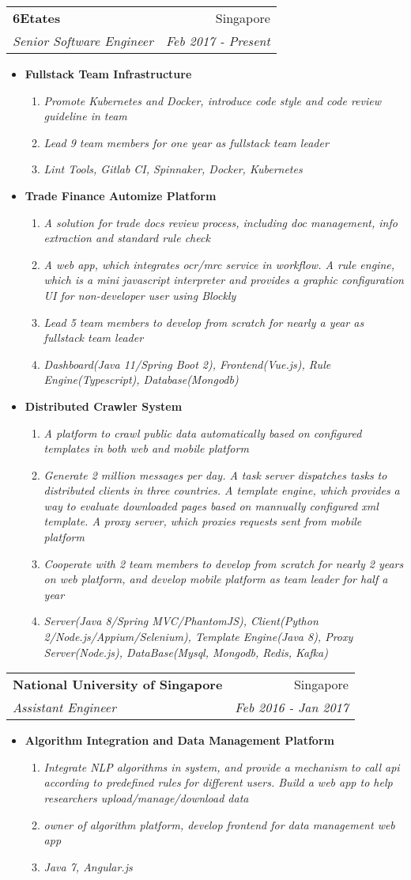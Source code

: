 \documentclass[letterpaper,11pt]{article}
\makeatletter
\newcommand{\resumeItem}[1]{
  \item\small{
    \textbf{#1 \vspace{-2pt}}
  }
}
\newcommand{\resumeSubItem}[1]{
  \item[-]\small{
    \textsl{#1\vspace{-1pt}}
  }
}
\newcommand{\resumeSubheading}[4]{
  \vspace{-1pt}\item
    \begin{tabular*}{0.97\textwidth}[t]{l@{\extracolsep{\fill}}r}
      \textbf{#1} & #2 \\
      \textit{\small#3} & \textit{\small #4} \\
    \end{tabular*}\vspace{-5pt}
}
\newcommand{\resumeItemListStart}{\begin{itemize}}
\newcommand{\resumeItemListEnd}{\end{itemize}\vspace{-5pt}}
\newcommand{\resumeSubItemListStart}{\begin{enumerate}}
\newcommand{\resumeSubItemListEnd}{\end{enumerate}\vspace{6pt}}
\makeatother
\begin{document}
    \resumeSubheading
      {6Etates}{Singapore}
      {Senior Software Engineer}{Feb 2017 - Present}
      \resumeItemListStart
        \resumeItem{Fullstack Team Infrastructure}
        \resumeSubItemListStart
          \resumeSubItem{Promote Kubernetes and Docker, introduce code style and code review guideline in team}
          \resumeSubItem{Lead 9 team members for one year as fullstack team leader}
          \resumeSubItem{Lint Tools, Gitlab CI, Spinnaker, Docker, Kubernetes}
        \resumeSubItemListEnd
        \resumeItem{Trade Finance Automize Platform}
        \resumeSubItemListStart
          \resumeSubItem{A solution for trade docs review process, including doc management, info extraction and standard rule check}
          \resumeSubItem{A web app, which integrates ocr/mrc service in workflow. A rule engine, which is a mini javascript interpreter and provides a graphic configuration UI for non-developer user using Blockly}
          \resumeSubItem{Lead 5 team members to develop from scratch for nearly a year as fullstack team leader}
          \resumeSubItem{Dashboard(Java 11/Spring Boot 2), Frontend(Vue.js), Rule Engine(Typescript), Database(Mongodb)}
        \resumeSubItemListEnd
        \resumeItem{Distributed Crawler System}
        \resumeSubItemListStart
          \resumeSubItem{A platform to crawl public data automatically based on configured templates in both web and mobile platform}
          \resumeSubItem{Generate 2 million messages per day. A task server dispatches tasks to distributed clients in three countries. A template engine, which provides a way to evaluate downloaded pages based on mannually configured xml template. A proxy server, which proxies requests sent from mobile platform}
          \resumeSubItem{Cooperate with 2 team members to develop from scratch for nearly 2 years on web platform, and develop mobile platform as team leader for half a year}
          \resumeSubItem{Server(Java 8/Spring MVC/PhantomJS), Client(Python 2/Node.js/Appium/Selenium), Template Engine(Java 8), Proxy Server(Node.js), DataBase(Mysql, Mongodb, Redis, Kafka)}
        \resumeSubItemListEnd
      \resumeItemListEnd
      
    \resumeSubheading
      {National University of Singapore}{Singapore}
      {Assistant Engineer}{Feb 2016 - Jan 2017}
      \resumeItemListStart
        \resumeItem{Algorithm Integration and Data Management Platform}
        \resumeSubItemListStart
          \resumeSubItem{Integrate NLP algorithms in system, and provide a mechanism to call api according to predefined rules for different users. Build a web app to help researchers upload/manage/download data}
          \resumeSubItem{owner of algorithm platform, develop frontend for data management web app}
          \resumeSubItem{Java 7, Angular.js}
        \resumeSubItemListEnd
      \resumeItemListEnd
\end{document}
